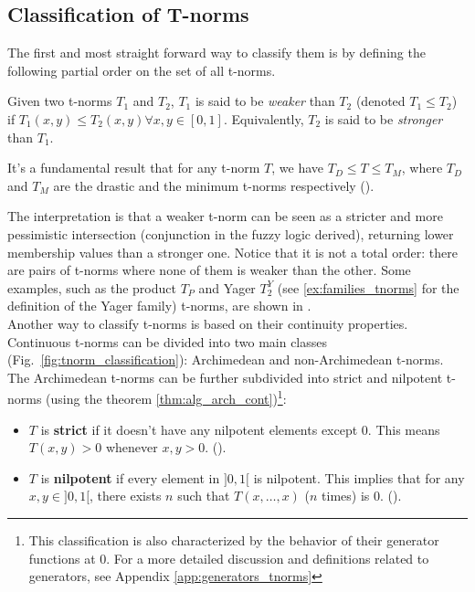 \subsection{Classification of T-norms}\label{sec:class_tnorms}
The first and most straight forward way to classify them is by defining the following partial order on the set of all t-norms. 
\begin{definition}\label{def:weaker}
  Given two t-norms $T_1$ and $T_2$, $T_1$ is said to be \emph{weaker} than $T_2$ (denoted $T_1 \leq T_2$) if $T_1(x,y) \leq T_2(x,y) \forall x,y \in [0,1]$.
  Equivalently, $T_2$ is said to be \emph{stronger} than $T_1$.
\end{definition}

\begin{remark}
  It's a fundamental result that for any t-norm $T$, we have $T_D \leq T \leq T_M$, where $T_D$ and $T_M$ are the drastic and the minimum t-norms respectively (\cite[Rem.~1.5]{Klement2000}).
\end{remark}

The interpretation is that a weaker t-norm can be seen as a stricter and more pessimistic intersection (conjunction in the fuzzy logic derived), returning lower membership values than a stronger one. Notice that it is not a total order: there are pairs of t-norms where none of them is weaker than the other. Some examples, such as the product $T_P$ and Yager $T_2^Y$ (see \ref{ex:families_tnorms} for the definition of the Yager family) t-norms, are shown in \cite[Fig.~6.1]{Klement2000}.\\


Another way to classify t-norms is based on their continuity properties. Continuous t-norms can be divided into two main classes (Fig.~\ref{fig:tnorm_classification}): Archimedean and non-Archimedean t-norms. The Archimedean t-norms can be further subdivided into strict and nilpotent t-norms (using the theorem \ref{thm:alg_arch_cont})\footnote{This classification is also characterized by the behavior of their generator functions at 0. For a more detailed discussion and definitions related to generators, see Appendix \ref{app:generators_tnorms}}:

\begin{itemize}
    \item $T$ is \textbf{strict} if it doesn't have any nilpotent elements except $0$. This means $T(x,y)>0$ whenever $x,y > 0$. (\cite[Cor.~3.30(i)]{Klement2000}).
    \item $T$ is \textbf{nilpotent} if every element in $]0,1[$ is nilpotent. This implies that for any $x,y \in ]0,1[$, there exists $n$ such that $T(x, \dots, x)$ ($n$ times) is $0$. (\cite[Cor.~3.30(ii)]{Klement2000}).
\end{itemize}


